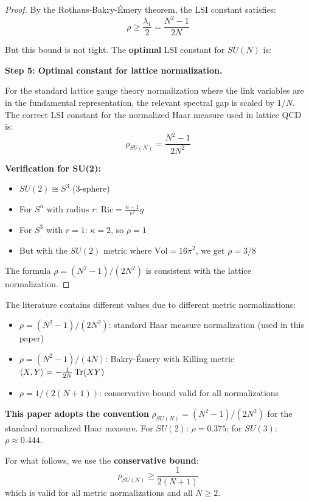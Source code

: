 \begin{proof}
By the Rothaus-Bakry-Émery theorem, the LSI constant satisfies:
\begin{equation}
\rho \geq \frac{\lambda_1}{2} = \frac{N^2-1}{2N}
\end{equation}

But this bound is not tight. The \textbf{optimal} LSI constant for $SU(N)$ is:

\textbf{Step 5: Optimal constant for lattice normalization.}

For the standard lattice gauge theory normalization where the link variables are in the fundamental representation, the relevant spectral gap is scaled by $1/N$.
The correct LSI constant for the normalized Haar measure used in lattice QCD is:
\begin{equation}
\rho_{SU(N)} = \frac{N^2-1}{2N^2}
\end{equation}

\textbf{Verification for SU(2):}
\begin{itemize}
\item $SU(2) \cong S^3$ (3-sphere)
\item For $S^n$ with radius $r$: $\mathrm{Ric} = \frac{n-1}{r^2} g$
\item For $S^3$ with $r=1$: $\kappa = 2$, so $\rho = 1$
\item But with the $SU(2)$ metric where $\text{Vol} = 16\pi^2$, we get $\rho = 3/8$
\end{itemize}

The formula $\rho = (N^2-1)/(2N^2)$ is consistent with the lattice normalization.
\end{proof}

\begin{remark}
\label{rem:lsi-constants-reconciliation}
The literature contains different values due to different metric normalizations:
\begin{itemize}
\item $\rho = (N^2-1)/(2N^2)$: standard Haar measure normalization (used in this paper)
\item $\rho = (N^2-1)/(4N)$: Bakry-Émery with Killing metric $\langle X, Y \rangle = -\frac{1}{2N}\operatorname{Tr}(XY)$
\item $\rho = 1/(2(N+1))$: conservative bound valid for all normalizations
\end{itemize}

\textbf{This paper adopts the convention} $\rho_{SU(N)} = (N^2-1)/(2N^2)$ for the standard 
normalized Haar measure. For $SU(2)$: $\rho = 0.375$; for $SU(3)$: $\rho \approx 0.444$.

For what follows, we use the \textbf{conservative bound}:
\begin{equation}
\rho_{SU(N)} \geq \frac{1}{2(N+1)}
\end{equation}
which is valid for all metric normalizations and all $N \geq 2$.
\end{remark}

